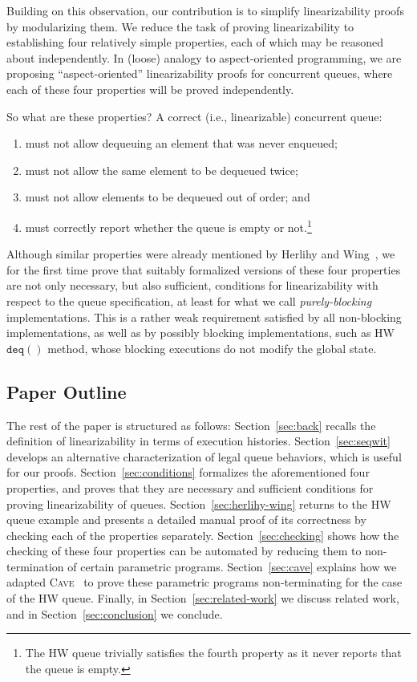 \documentclass{LMCS}
\newcommand{\deq}{\ensuremath{\mathtt{deq}}}
\begin{document}
Building on this observation, our contribution is to simplify linearizability proofs by modularizing them.
We reduce the task of proving linearizability to establishing four relatively
simple properties, each of which may be reasoned about independently.
In (loose) analogy to aspect-oriented programming, 
we are proposing ``aspect-oriented'' linearizability proofs for concurrent queues,
where each of these four properties will be proved independently.

So what are these properties?  A correct (i.e., linearizable)
concurrent queue:
\begin{enumerate}
\item must not allow dequeuing an element that was never enqueued;
\item must not allow the same element to be dequeued twice;
\item must not allow elements to be dequeued out of order; and
\item must correctly report whether the queue is empty or not.\footnote{The HW queue trivially satisfies the fourth property as it never reports
that the queue is empty.}
\end{enumerate}

Although similar properties were already mentioned by Herlihy and Wing~\cite{HW1990}, 
we for the first time prove that suitably formalized versions of these four properties
are not only necessary, but also sufficient, conditions for linearizability 
with respect to the queue specification, at least for what we call 
\emph{purely-blocking} implementations.
This is a rather weak requirement satisfied by all non-blocking implementations,
as well as by possibly blocking implementations, such as HW $\deq()$ method, whose
blocking executions do not modify the global state.


\subsection*{Paper Outline}

The rest of the paper is structured as follows:
Section~\ref{sec:back} recalls the definition of linearizability in terms of execution histories.
Section~\ref{sec:seqwit} develops an alternative characterization of legal queue behaviors, which is useful for our proofs.
Section~\ref{sec:conditions} formalizes the aforementioned four properties, and proves that they are necessary and sufficient conditions for proving linearizability of queues.
Section~\ref{sec:herlihy-wing} returns to the HW queue example and presents a detailed manual proof of its correctness by checking each of the properties separately.
Section~\ref{sec:checking} shows how the checking of these four properties can be automated by reducing them to non-termination of certain parametric programs.
Section~\ref{sec:cave} explains how we adapted \textsc{Cave}~\cite{Vaf2010} to prove these parametric programs non-terminating for the case of the HW queue.
Finally, in Section~\ref{sec:related-work} we discuss related work, and in Section~\ref{sec:conclusion} we conclude.
\end{document}
